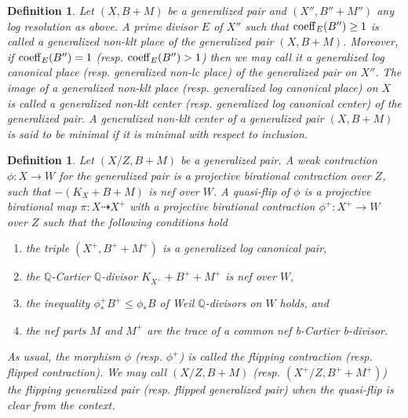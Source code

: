 \documentclass{amsart}
\renewcommand{\qq}{\mathbb{Q}}
\newtheorem{definition}[theorem]{Definition}
\theoremstyle{remark}
\numberwithin{equation}{section}
\begin{document}
\begin{definition}
{\em 
Let $(X,B+M)$ be a generalized pair and $(X'',B''+M'')$ any log resolution as above. 
A prime divisor $E$ of $X''$ such that ${\rm coeff}_E(B'')\geq 1$ is called 
a {\em generalized non-klt place} of the generalized pair $(X,B+M)$.
Moreover, if ${\rm coeff}_E(B'')=1$ (resp. ${\rm coeff}_E(B'')>1$) 
then we may call it a {\em generalized log canonical place}
(resp. {\em generalized non-lc place}) of the generalized pair on $X''$.
The image of a generalized non-klt place (resp. generalized log canonical place) on $X$ is called a
{\em generalized non-klt center} (resp. generalized log canonical center) of the generalized pair.
A generalized non-klt center of a generalized pair $(X,B+M)$ is said to be {\em minimal}
if it is minimal with respect to inclusion.
}
\end{definition}

\begin{definition}
{\em Let $(X/Z,B+M)$ be a generalized pair. A {\em weak contraction} $\phi \colon X \rightarrow W$ for the generalized pair
is a projective birational contraction over $Z$, such that $-(K_X+B+M)$ is nef over $W$.
A {\em quasi-flip} of $\phi$ is a projective birational map $\pi \colon X \dashrightarrow X^+$ with a projective birational contraction
$\phi^+\colon X^+\rightarrow W$ over $Z$ such that the following conditions hold
\begin{enumerate}
\item the triple $(X^+,B^{+}+M^{+})$ is a generalized log canonical pair,
\item the $\qq$-Cartier $\qq$-divisor $K_{X^{+}}+B^{+}+M^{+}$ is nef over $W$,
\item the inequality $\phi^{+}_{*}B^{+}\leq \phi_{*}B$ of Weil $\qq$-divisors on $W$ holds, and
\item the nef parts $M$ and $M^{+}$ are the trace of a common nef b-Cartier b-divisor.
\end{enumerate}
As usual, the morphism $\phi$ (resp. $\phi^+$) is called the {\em flipping contraction} (resp. {\em flipped contraction}).
We may call $(X/Z,B+M)$ (resp. $(X^{+}/Z,B^{+}+M^{+})$) the {\em flipping generalized pair} (resp. {\em flipped generalized pair})
when the quasi-flip is clear from the context.  
}
\end{definition}
\end{document}
